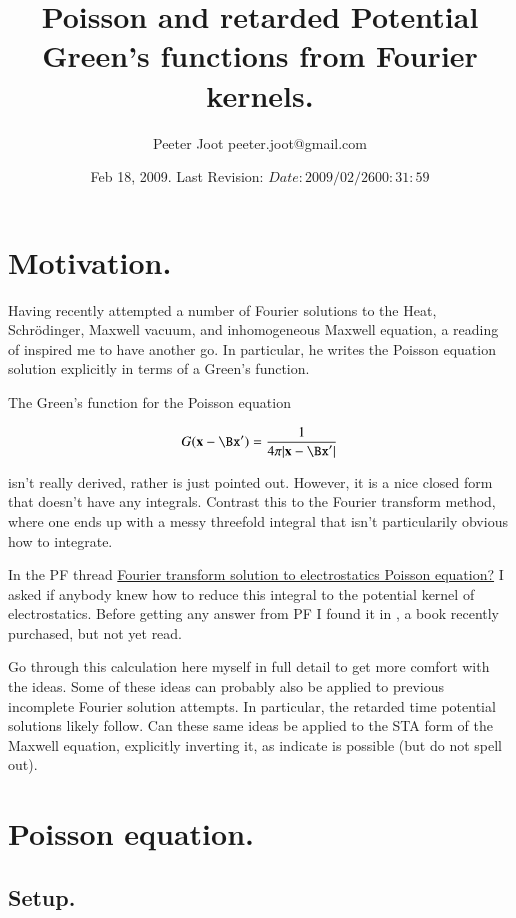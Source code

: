 \documentclass{article}
\title{ Poisson and retarded Potential Green's functions from Fourier kernels. }
\author{Peeter Joot \quad peeter.joot@gmail.com}
\date{ Feb 18, 2009.  Last Revision: $Date: 2009/02/26 00:31:59 $ }
\begin{document}
\maketitle{}
\tableofcontents

\section{ Motivation.}

Having recently attempted a number of Fourier solutions to the Heat, Schr\"{o}dinger, Maxwell vacuum, and inhomogeneous Maxwell equation, a reading
of \cite{mjPerryElectrodynamics} inspired me to have another go.  In particular, he writes the Poisson equation solution explicitly in terms of a Green's 
function.

The Green's function for the Poisson equation

\begin{align}
G(\mathbf{x} - \Bx') = \frac{1}{4\pi\lvert{\mathbf{x} -\Bx'}\rvert}
\end{align}

isn't really derived, rather is just pointed out.  However, it is a nice closed form that doesn't have any integrals.
Contrast this to the Fourier transform method, where one ends up with a messy threefold 
integral that isn't particularily obvious how to integrate.

In the PF thread \href{http://www.physicsforums.com/showthread.php?t=293550}{Fourier transform solution to electrostatics Poisson equation?}
I asked if anybody knew how to reduce this integral to the
potential kernel of electrostatics.  Before getting any answer from PF I found it in 
\cite{byron1992mca}, a book recently purchased, but not yet read.


Go through this calculation here myself in full detail to get more comfort with the ideas.  Some of these ideas can probably also be applied to 
previous incomplete Fourier solution attempts.  In particular, the retarded time potential solutions likely follow.
Can these same ideas be applied to the STA form of the Maxwell equation, explicitly inverting it, as 
\cite{doran2003gap} indicate is possible (but do not spell out).

\section{ Poisson equation. }
\subsection{ Setup. }
\end{document}
